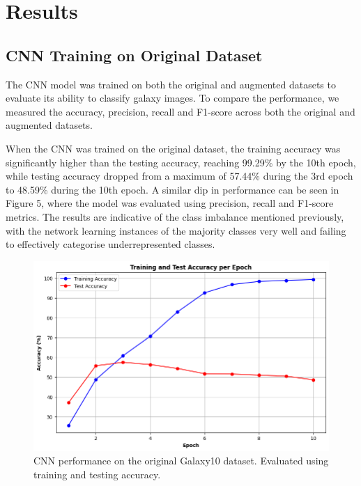 \documentclass[10pt,twocolumn,letterpaper]{article}
\begin{document}
\section{Results}
\subsection{CNN Training on Original Dataset}
The CNN model was trained on both the original and augmented datasets to evaluate its ability to classify galaxy images. 
To compare the performance, we measured the accuracy, precision, recall and F1-score across both the original and augmented datasets.

When the CNN was trained on the original dataset, the training accuracy was significantly higher than the testing accuracy, reaching 99.29\% by the 10th epoch, while testing accuracy dropped from a maximum of 57.44\% during the 3rd epoch to 48.59\% during the 10th epoch.
A similar dip in performance can be seen in Figure 5, where the model was evaluated using precision, recall and F1-score metrics. 
The results are indicative of the class imbalance mentioned previously, with the network learning instances of the majority classes very well and failing to effectively categorise underrepresented classes. 
\begin{figure}[htbp]
    \includegraphics[width=\linewidth]{initial_cnn_acc.png}
    \caption{CNN performance on the original Galaxy10 dataset. Evaluated using training and testing accuracy.}
    \label{fig:initialcnnacc}
  \end{figure}
\end{document}
